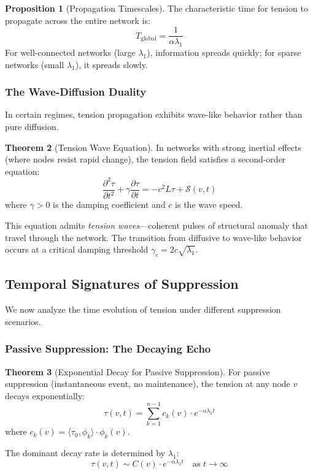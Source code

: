 \documentclass[12pt,a4paper]{article}
\theoremstyle{definition}
\newtheorem{theorem}{Theorem}[section]
\newtheorem{proposition}[theorem]{Proposition}
\theoremstyle{remark}
\begin{document}
\begin{proposition}[Propagation Timescales]
The characteristic time for tension to propagate across the entire network is:
\begin{equation}
    T_{\text{global}} = \frac{1}{\alpha \lambda_1}
\end{equation}
For well-connected networks (large $\lambda_1$), information spreads quickly; for sparse networks (small $\lambda_1$), it spreads slowly.
\end{proposition}

\subsubsection{The Wave-Diffusion Duality}

In certain regimes, tension propagation exhibits wave-like behavior rather than pure diffusion.

\begin{theorem}[Tension Wave Equation]
\label{thm:wave}
In networks with strong inertial effects (where nodes resist rapid change), the tension field satisfies a second-order equation:
\begin{equation}
    \boxed{
    \frac{\partial^2 \tau}{\partial t^2} + \gamma \frac{\partial \tau}{\partial t} = -c^2 L \tau + \mathcal{S}(v, t)
    }
\end{equation}
where $\gamma > 0$ is the damping coefficient and $c$ is the wave speed.
\end{theorem}

This equation admits \emph{tension waves}—coherent pulses of structural anomaly that travel through the network. The transition from diffusive to wave-like behavior occurs at a critical damping threshold $\gamma_c = 2c\sqrt{\lambda_1}$.

\subsection{Temporal Signatures of Suppression}

We now analyze the time evolution of tension under different suppression scenarios.

\subsubsection{Passive Suppression: The Decaying Echo}

\begin{theorem}[Exponential Decay for Passive Suppression]
\label{thm:passive-decay}
For passive suppression (instantaneous event, no maintenance), the tension at any node $v$ decays exponentially:
\begin{equation}
    \tau(v, t) = \sum_{k=1}^{n-1} c_k(v) \cdot e^{-\alpha \lambda_k t}
\end{equation}
where $c_k(v) = \langle \tau_0, \phi_k \rangle \cdot \phi_k(v)$.

The dominant decay rate is determined by $\lambda_1$:
\begin{equation}
    \boxed{
    \tau(v, t) \sim C(v) \cdot e^{-\alpha \lambda_1 t} \quad \text{as } t \to \infty
    }
\end{equation}
\end{theorem}
\end{document}
